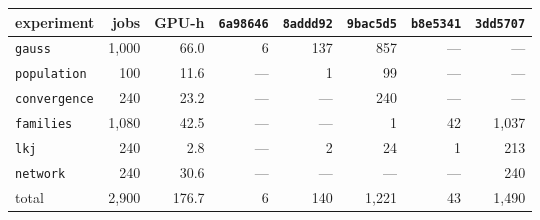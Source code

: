 \small
\begin{tabular}{lrrrrrrr}
\toprule
experiment & jobs & GPU-h & \texttt{6a98646} & \texttt{8addd92} & \texttt{9bac5d5} & \texttt{b8e5341} & \texttt{3dd5707} \\
\midrule
\texttt{gauss} & 1{,}000 & 66.0 & 6 & 137 & 857 & --- & --- \\
\texttt{population} & 100 & 11.6 & --- & 1 & 99 & --- & --- \\
\texttt{convergence} & 240 & 23.2 & --- & --- & 240 & --- & --- \\
\texttt{families} & 1{,}080 & 42.5 & --- & --- & 1 & 42 & 1{,}037 \\
\texttt{lkj} & 240 & 2.8 & --- & 2 & 24 & 1 & 213 \\
\texttt{network} & 240 & 30.6 & --- & --- & --- & --- & 240 \\
\midrule
total & 2{,}900 & 176.7 & 6 & 140 & 1{,}221 & 43 & 1{,}490 \\
\bottomrule
\end{tabular}
